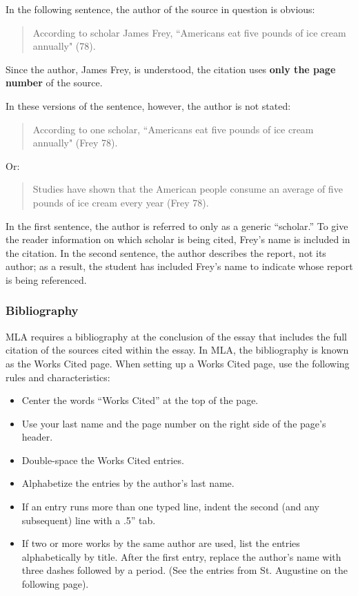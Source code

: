 In the following sentence, the author of the source in question is obvious:

\begin{quote}According to scholar James Frey, ``Americans eat five pounds of ice cream annually" (78).
\end{quote}

Since the author, James Frey, is understood, the citation uses \textbf{only the page number} of the source.

In these versions of the sentence, however, the author is not stated:

\begin{quote}
According to one scholar, ``Americans eat five pounds of ice cream annually" (Frey 78).
\end{quote}
Or:

\begin{quote}
Studies have shown that the American people consume an average of five pounds of ice cream every year (Frey 78).
\end{quote}
In the first sentence, the author is referred to only as a generic ``scholar.'' To give the reader information on which scholar is being cited, Frey's name is included in the citation. In the second sentence, the author describes the report, not its author; as a result, the student has included Frey's name to indicate whose report is being referenced. 


\subsubsection{Bibliography}

MLA requires a bibliography at the conclusion of the essay that includes the full citation of the sources cited within the essay. In MLA, the bibliography is known as the Works Cited page. When setting up a Works Cited page, use the following rules and characteristics:

\begin{itemize}
\item Center the words ``Works Cited'' at the top of the page.
\item Use your last name and the page number on the right side of the page's header.
\item Double-space the Works Cited entries.
\item Alphabetize the entries by the author's last name.
\item If an entry runs more than one typed line, indent the second (and any subsequent) line with a .5'' tab.
\item If two or more works by the same author are used, list the entries alphabetically by title. After the first entry, replace the author's name with three dashes followed by a period. (See the entries from St. Augustine on the following page).
\end{itemize}


